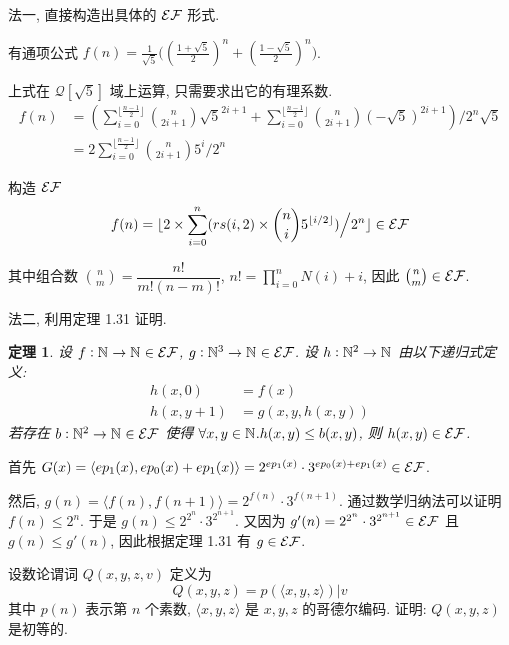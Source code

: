 \begin{solution}
\begin{enumerate}
法一, 直接构造出具体的 $\mathcal{EF}$ 形式.

有通项公式 $f(n) = \frac{1}{\sqrt{5}} \big ( (\frac{1 + \sqrt{5}}{2})^n + (\frac{1 - \sqrt{5}}{2})^n \big )$.

上式在 $\mathcal{Q}[\sqrt{5}]$ 域上运算, 只需要求出它的有理系数.
\begin{align*}
f(n) & = (\sum_{i=0}^{\lfloor \frac{n-1}{2} \rfloor} {n \choose 2i+1} \sqrt{5}^{2i+1} + \sum_{i=0}^{\lfloor \frac{n-1}{2} \rfloor} {n \choose 2i+1} (-\sqrt{5})^{2i+1}) \Big / 2^n \sqrt{5} \\
& = 2\sum_{i=0}^{\lfloor \frac{n-1}{2} \rfloor} {n \choose 2i+1} 5^{i} \Big / 2^n
\end{align*}

构造 $\mathcal{EF}$
\[
f(n) = \lfloor 2 \times \sum_{i=0}^n (rs(i, 2) \times {n \choose i} 5^{\lfloor i / 2 \rfloor}) \Big / 2^n \rfloor \in \mathcal{EF}
\]

其中组合数 ${n \choose m} = \dfrac{n!}{m!(n-m)!}$, $n! = \prod_{i=0}^n N(i) + i$, 因此 ${n \choose m} \in \mathcal{EF}$.

\bigbreak

法二, 利用定理 1.31 证明.

\newtheorem*{remark}{定理}
\begin{remark}
设 $f : \mathbb{N}^{} \to \mathbb{N}^{} \in \mathcal{EF}$, $g : \mathbb{N}^{3} \to \mathbb{N}^{} \in \mathcal{EF}$. 设 $h : \mathbb{N}^{2} \to \mathbb{N}^{}$ 由以下递归式定义:
\begin{align*}
h(x, 0) & = f(x) \\
h(x, y + 1) & = g(x, y, h(x, y))
\end{align*}
若存在 $b : \mathbb{N}^{2} \to \mathbb{N}^{} \in \mathcal{EF}$ 使得 $\forall x, y \in \mathbb{N}^{}. h(x, y) \le b(x, y)$, 则 $h(x, y) \in \mathcal{EF}$.
\end{remark}

首先 $G(x) = \langle ep_1(x), ep_0(x) + ep_1(x) \rangle = 2^{ep_1(x)} \cdot 3^{ep_0(x) + ep_1(x)} \in \mathcal{EF}$.

然后, $g(n) = \langle f(n), f(n + 1) \rangle = 2^{f(n)} \cdot 3^{f(n+1)}$. 通过数学归纳法可以证明 $f(n) \le 2^n$. 于是 $g(n) \le 2^{2^n} \cdot 3^{2^{n+1}}$. 又因为 $g'(n) = 2^{2^n} \cdot 3^{2^{n+1}} \in \mathcal{EF}$ 且 $g(n) \le g'(n)$, 因此根据定理 1.31 有 $g \in \mathcal{EF}$.

\end{enumerate}
\end{solution}

\begin{problem}
设数论谓词 $Q(x,y,z,v)$ 定义为
\[
Q(x,y,z) = p(\langle x, y, z \rangle) \big | v
\]
其中 $p(n)$ 表示第 $n$ 个素数, $\langle x, y, z \rangle$ 是 $x,y,z$ 的哥德尔编码. 证明: $Q(x,y,z)$ 是初等的.
\end{problem}

